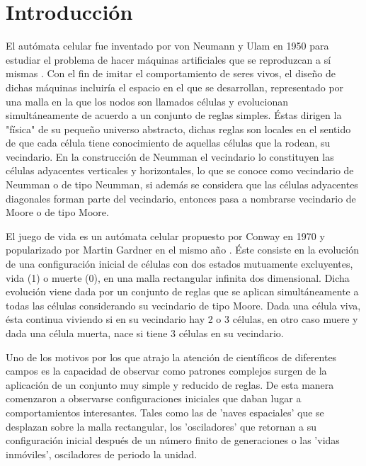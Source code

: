 \documentclass[../proyecto.tex]{book}
\begin{document}
\chapter{Introducción}

El autómata celular fue inventado por von Neumann y Ulam en 1950 para estudiar el problema de hacer máquinas artificiales que se reproduzcan a sí mismas \cite{neummanUlam}. Con el fin de imitar el comportamiento de seres vivos, el diseño de dichas máquinas incluiría el espacio en el que se desarrollan, representado por una malla en la que los nodos son llamados células y evolucionan simultáneamente de acuerdo a un conjunto de reglas simples. Éstas dirigen la "física" de su pequeño universo abstracto, dichas reglas son locales en el sentido de que cada célula tiene conocimiento de aquellas células que la rodean, su vecindario. En la construcción de Neumman el vecindario lo constituyen las células adyacentes verticales y horizontales, lo que se conoce como vecindario de Neumman o de tipo Neumman, si además se considera que las células adyacentes diagonales forman parte del vecindario, entonces pasa a nombrarse vecindario de Moore o de tipo Moore.

El juego de vida es un autómata celular propuesto por Conway en 1970 y popularizado por Martin Gardner en el mismo año \cite{primerap}. Éste consiste en la evolución de una configuración inicial de células con dos estados mutuamente excluyentes, vida (1) o muerte (0), en una malla rectangular infinita dos dimensional. Dicha evolución viene dada por un conjunto de reglas que se aplican simultáneamente a todas las células considerando su vecindario de tipo Moore. Dada una célula viva, ésta continua viviendo si en su vecindario hay 2 o 3 células, en otro caso muere y dada una célula muerta, nace si tiene 3 células en su vecindario.

Uno de los motivos por los que atrajo la atención de científicos de diferentes campos es la capacidad de observar como patrones complejos surgen de la aplicación de un conjunto muy simple y reducido de reglas. De esta manera comenzaron a observarse configuraciones iniciales que daban lugar a comportamientos interesantes. Tales como las de 'naves espaciales' que se desplazan sobre la malla rectangular, los 'osciladores' que retornan a su configuración inicial después de un número finito de generaciones o las 'vidas inmóviles', osciladores de periodo la unidad.
\end{document}
